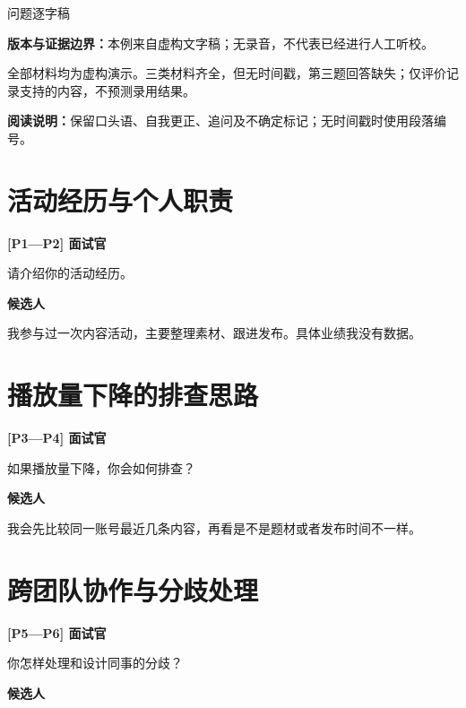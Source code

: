 \documentclass[UTF8,fontset=fandol,10pt]{ctexart}
\begin{document}
\begin{center}{\large 问题逐字稿}\par\vspace{4mm}{\LARGE\bfseries 虚构案例：内容运营面试复盘}\par\vspace{2mm}{\large\bfseries 问题与现场回答原话}\par\vspace{3mm}{\small 虚构演示 · 内容运营 · 无时间戳文字稿}\end{center}\textbf{版本与证据边界：}本例来自虚构文字稿；无录音，不代表已经进行人工听校。\par 全部材料均为虚构演示。三类材料齐全，但无时间戳，第三题回答缺失；仅评价记录支持的内容，不预测录用结果。\par\textbf{阅读说明：}保留口头语、自我更正、追问及不确定标记；无时间戳时使用段落编号。\par\section*{活动经历与个人职责}\textbf{[P1—P2] 面试官}\par 请介绍你的活动经历。\par \textbf{候选人}\par 我参与过一次内容活动，主要整理素材、跟进发布。具体业绩我没有数据。\par \section*{播放量下降的排查思路}\textbf{[P3—P4] 面试官}\par 如果播放量下降，你会如何排查？\par \textbf{候选人}\par 我会先比较同一账号最近几条内容，再看是不是题材或者发布时间不一样。\par \section*{跨团队协作与分歧处理}\textbf{[P5—P6] 面试官}\par 你怎样处理和设计同事的分歧？\par \textbf{候选人}\par [该段缺失，无法核对回答]\par 
\end{document}
